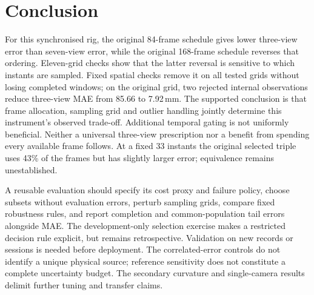 \documentclass{iopjournal}
\begin{document}
\section{Conclusion}
\label{sec:conclusion}
For this synchronised rig, the original 84-frame schedule gives lower
three-view error than seven-view error, while the original 168-frame schedule
reverses that ordering. Eleven-grid checks show that the latter reversal is
sensitive to which instants are sampled. Fixed spatial checks remove it on
all tested grids without losing completed windows; on the original grid,
two rejected internal observations reduce three-view MAE from 85.66 to
7.92\,mm. The supported conclusion is that frame allocation, sampling grid
and outlier handling jointly determine this instrument's observed trade-off.
Additional temporal gating is not uniformly beneficial. Neither a universal
three-view prescription nor a benefit from spending every available frame
follows. At a fixed 33 instants the original selected triple uses 43\% of
the frames but has slightly larger error; equivalence remains unestablished.

A reusable evaluation should specify its cost proxy and failure policy,
choose subsets without evaluation errors, perturb sampling grids, compare
fixed robustness rules, and report completion and common-population tail
errors alongside MAE. The development-only selection exercise makes a
restricted decision rule explicit, but remains retrospective. Validation
on new records or sessions is needed before deployment. The correlated-error
controls do not identify a unique physical source; reference sensitivity
does not constitute a complete uncertainty budget. The secondary curvature
and single-camera results delimit further tuning and transfer claims.



\end{document}
